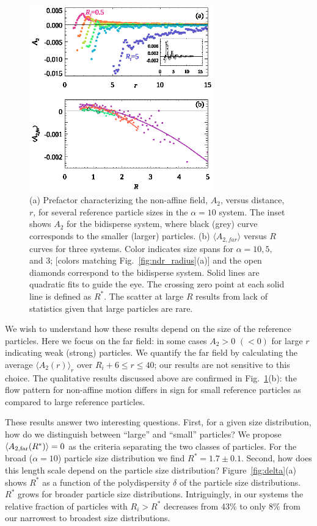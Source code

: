 \documentclass[%
 reprint,
 amsmath,amssymb,
 aps,
]{revtex4-2}
\begin{document}
\begin{figure}
    \centering
    \includegraphics[width=8cm]{rstar_a2r_081923.eps}
    \caption{(a) Prefactor characterizing the non-affine field, $A_2$, versus distance, $r$, for several reference particle sizes in the $\alpha=10$ system.  The inset shows $A_2$ for the bidisperse system, where black (grey) curve corresponds to the smaller (larger) particles. (b) $\langle A_{2,far} \rangle$ versus $R$ curves for three systems. Color indicates size spans for $\alpha = 10, 5,$ and 3; [colors matching Fig.~\ref{fig:ndr_radius}(a)] and the open diamonds correspond to the bidisperse system. Solid lines are quadratic fits to guide the eye. The crossing zero point at each solid line is defined as $R^{\ast}$. The scatter at large $R$ results from lack of statistics given that large particles are rare.}
    \label{fig:far_a2}
    \vspace*{-10pt}
\end{figure}

We wish to understand how these results depend on the size of the reference particles. Here we focus on the far field:  in some cases $A_2>0$ $(<0)$ for large $r$ indicating weak (strong) particles.  We quantify the far field by calculating the average $\langle {A_2}(r) \rangle_r$ over $R_i + 6 \leq r \leq 40$; our results are not sensitive to this choice.  The qualitative results discussed above are confirmed in  Fig.~\ref{fig:far_a2}(b): the flow pattern for non-affine motion differs in sign for small reference particles as compared to large reference particles.

These results answer two interesting questions.  First, for a given size distribution, how do we distinguish between ``large'' and ``small'' particles? We propose $\langle A_{2,{\rm far}}(R^*) \rangle = 0$ as the criteria separating the two classes of particles.  For the broad ($\alpha=10$) particle size distribution we find ${R}^* = 1.7 \pm 0.1$. Second, how does this length scale depend on the particle size distribution?  Figure~\ref{fig:delta}(a) shows $R^*$ as a function of the polydispersity $\delta$ of the particle size distributions.  $R^*$ grows for broader particle size distributions.  Intriguingly, in our systems the relative fraction of particles with $R_i > R^*$ decreases from 43\% to only 8\% from our narrowest to broadest size distributions. 
\end{document}
